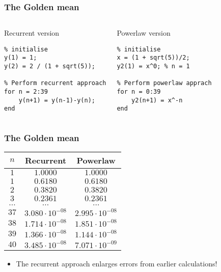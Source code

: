 % 
\begin{frame}[fragile]
  \frametitle{The Golden mean}
  \begin{columns}[T]
      \begin{block}{Recurrent version}
        \begin{lstlisting}
% initialise
y(1) = 1;
y(2) = 2 / (1 + sqrt(5));

% Perform recurrent approach
for n = 2:39
    y(n+1) = y(n-1)-y(n);
end
        \end{lstlisting}
      \end{block}
    \pause
      \begin{block}{Powerlaw version}
        \begin{lstlisting}
% initialise
x = (1 + sqrt(5))/2;
y2(1) = x^0; % n = 1

% Perform powerlaw apprach
for n = 0:39
    y2(n+1) = x^-n
end
        \end{lstlisting}
      \end{block}
  \end{columns}
\end{frame}
% 
\begin{frame}[fragile]
  \frametitle{The Golden mean}
    \begin{longtable}{c!{\vrule}cc}
    \hline
      $n$   & Recurrent & Powerlaw \\ \hline
      $1$   & $1.0000$ & $1.0000$ \\
      $1$   & $0.6180$ & $0.6180$ \\
      $2$   & $0.3820$ & $0.3820$ \\
      $3$   & $0.2361$ & $0.2361$ \\
      $\ldots$ & $\ldots$ & $\ldots$ \\
      $37$ & $3.080\cdot10^{-08}$ & $2.995\cdot10^{-08}$ \\
      $38$ & $1.714\cdot10^{-08}$ & $1.851\cdot10^{-08}$ \\
      $39$ & $1.366\cdot10^{-08}$ & $1.144\cdot10^{-08}$ \\
      $40$ & $3.485\cdot10^{-08}$ & $7.071\cdot10^{-09}$ \\ \hline
    \end{longtable} 
    \begin{itemize}
       \item The recurrent approach enlarges errors from earlier calculations!
    \end{itemize}
\end{frame}

